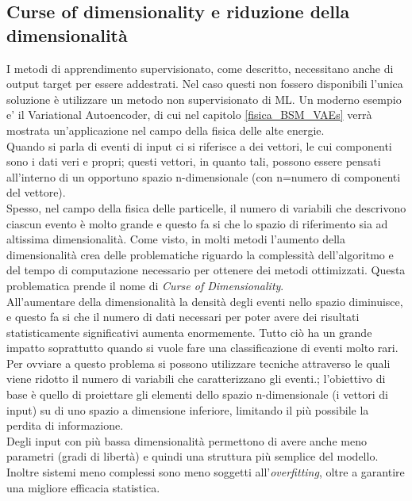 \newpage


\subsection{Curse of dimensionality e riduzione della dimensionalità}
\label{curse_dim}

I metodi di apprendimento supervisionato, come descritto, necessitano anche di output target per essere addestrati. Nel caso questi non fossero disponibili l'unica soluzione è utilizzare un metodo non supervisionato di ML. Un moderno esempio e' il Variational Autoencoder, di cui nel capitolo \ref{fisica_BSM_VAEs} verrà mostrata un'applicazione nel campo della fisica delle alte energie. \\
Quando si parla di eventi di input ci si riferisce a dei vettori, le cui componenti sono i dati veri e propri; questi vettori, in quanto tali, possono essere pensati all'interno di un opportuno spazio n-dimensionale (con n=numero di componenti del vettore).\\
Spesso, nel campo della fisica delle particelle, il numero di variabili che descrivono ciascun evento è molto grande e  questo fa si che lo spazio di riferimento sia ad altissima dimensionalità. Come visto, in molti metodi l'aumento della dimensionalità crea delle problematiche riguardo la complessità dell'algoritmo e del tempo di computazione necessario per ottenere dei metodi ottimizzati. Questa problematica prende il nome di \textit{Curse of Dimensionality}. \\
All'aumentare della dimensionalità la densità degli eventi nello spazio diminuisce, e questo fa si che il numero di dati necessari per poter avere dei risultati statisticamente significativi aumenta enormemente. Tutto ciò ha un grande impatto soprattutto quando si vuole fare una classificazione di eventi molto rari.\\
Per ovviare a questo problema si possono utilizzare tecniche attraverso le quali viene ridotto il numero di variabili che caratterizzano gli eventi.; l'obiettivo di base è quello di proiettare gli elementi dello spazio n-dimensionale (i vettori di input) su di uno spazio a dimensione inferiore, limitando il più possibile la perdita di informazione.\\
Degli input con più bassa dimensionalità permettono di avere anche meno parametri (gradi di libertà) e quindi una struttura più semplice del modello. Inoltre sistemi meno complessi sono meno soggetti all'\textit{overfitting}, oltre a garantire una migliore efficacia statistica. \\
